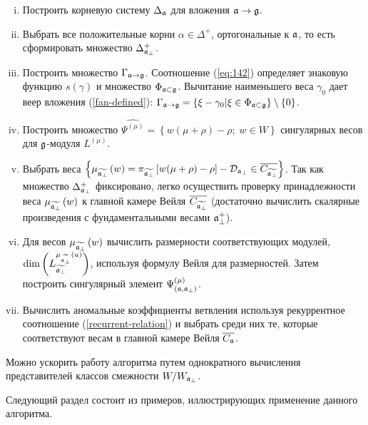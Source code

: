 \begin{enumerate}[(i)]
\item Построить корневую систему $\Delta _{\mathfrak{a}}$ для вложения $\mathfrak{a}\rightarrow \mathfrak{g}$.

\item Выбрать все положительные корни $\alpha \in \Delta ^{+}$, ортогональные к  $\mathfrak{a}$, то есть сформировать множество $\Delta_{\mathfrak{a}_{\perp} }^{+}$.

\item Построить множество $\Gamma _{\mathfrak{a}\rightarrow \mathfrak{g}}$. Соотношение  (\ref{eq:142}) определяет знаковую функцию $s(\gamma)$ и множество $\Phi_{\mathfrak{a}\subset \mathfrak{g}}$. Вычитание наименьшего веса $\gamma_0$ дает веер вложения (\ref{fan-defined}):
 $\Gamma _{\mathfrak{a}\rightarrow \mathfrak{g}}=\left\{ \xi -\gamma _{0}|\xi \in \Phi _{\mathfrak{a}\subset \mathfrak{g}}\right\} \setminus \left\{ 0\right\}$.

\item Построить множество $\widehat{\Psi ^{(\mu )}}=\left\{ w (\mu +\rho
)-\rho ;\;w \in W\right\} $ сингулярных весов для  $\mathfrak{g}$-модуля $L^{(\mu )}$.

\item Выбрать веса $\left\{ \mu _{\widetilde{\mathfrak{a}_{\perp}}}\left( w\right) =\pi _{\widetilde{\mathfrak{a}_{\perp}}}\left[ w(\mu +\rho
)-\rho \right] -\mathcal{D}_{\mathfrak{a}_{\perp}}\in \overline{C_{\widetilde{\mathfrak{a}_{\perp}}}}\right\} $. Так как множество  $\Delta_{\mathfrak{a}_{\perp} }^{+}$ фиксировано, легко осуществить проверку принадлежности веса $\mu _{\widetilde{\mathfrak{a}_{\perp}}}\left( w\right) $ к главной камере Вейля $\overline{C_{\widetilde{\mathfrak{a}_{\perp}}}}$ (достаточно вычислить скалярные произведения с фундаментальными весами $\mathfrak{a}_{\perp}^{+}$).

\item Для весов $\mu _{\widetilde{\mathfrak{a}_{\perp}}}\left( w\right) $ вычислить размерности соответствующих модулей, $\mathrm{\dim }\left(L_{\widetilde{\mathfrak{a}_{\perp}}}^{\mu _{\widetilde{\mathfrak{a}_{\perp}}}\left( u\right) }\right) $, используя формулу Вейля для размерностей. Затем построить сингулярный элемент $\Psi ^{\left( \mu \right) }_{\left(  \mathfrak{a}, \mathfrak{a}_{\perp} \right)}$.

\item Вычислить аномальные коэффициенты ветвления используя рекуррентное соотношение (\ref{recurrent-relation}) и выбрать среди них те, которые соответствуют весам в главной камере Вейля $\overline{C_{\mathfrak{a}}}$.
\end{enumerate}

Можно ускорить работу алгоритма путем однократного вычисления представителей классов смежности $W/W_{\mathfrak{a}_{\perp} }$.

Следующий раздел состоит из примеров, иллюстрирующих применение данного алгоритма.

